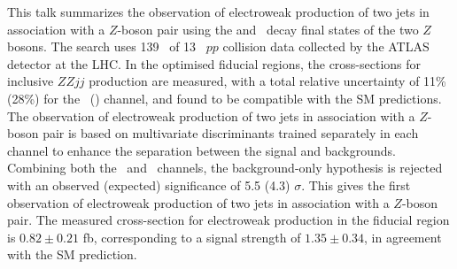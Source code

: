 This talk summarizes the observation of electroweak production of two jets in association with a $Z$-boson pair using the \llll and \llvv~decay final states of the two $Z$ bosons. The search uses 139 \ifb~of 13 \TeV~$pp$ collision data collected by the ATLAS detector at the LHC. In the optimised fiducial regions, the cross-sections for inclusive $ZZjj$ production are measured, with a total relative uncertainty of 11\% (28\%) for the \lllljj~(\llvvjj) channel, and found to be compatible with the SM predictions.
The observation of electroweak production of two jets in association with a $Z$-boson pair is based on multivariate discriminants trained separately in each channel to enhance the separation between the signal and backgrounds. Combining both the \lllljj~and \llvvjj~channels, the background-only hypothesis is rejected with an observed (expected) significance of 5.5 (4.3) $\sigma$.
This gives the first observation of electroweak production of two jets in association with a $Z$-boson pair.
The measured cross-section for electroweak production in the fiducial region is $0.82\pm0.21$ fb,
corresponding to a signal strength of $1.35\pm0.34$, in agreement with the SM prediction.
